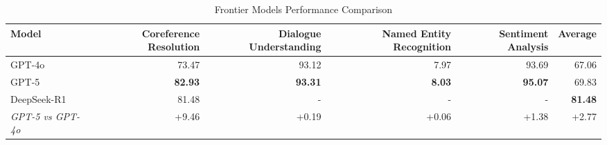 \begin{table}[htbp]
\centering
\caption{Frontier Models Performance Comparison}
\label{tab:frontier_models}
\begin{tabular}{lrrrrr}
\toprule
Model & Coreference Resolution & Dialogue Understanding & Named Entity Recognition & Sentiment Analysis & Average \\
\midrule
GPT-4o & 73.47 & 93.12 & 7.97 & 93.69 & 67.06 \\
GPT-5 & \textbf{82.93} & \textbf{93.31} & \textbf{8.03} & \textbf{95.07} & 69.83 \\
DeepSeek-R1 & 81.48 & - & - & - & \textbf{81.48} \\
\midrule
\textit{GPT-5 vs GPT-4o} & +9.46 & +0.19 & +0.06 & +1.38 & +2.77 \\
\bottomrule
\end{tabular}
\end{table}
